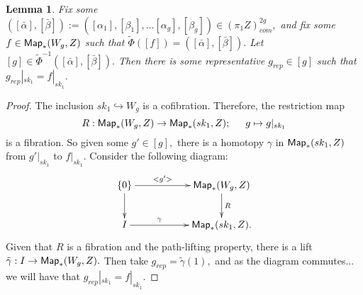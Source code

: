 \documentclass{amsart}
\newtheorem{lemma}[theorem]{Lemma}
\theoremstyle{definition}
\theoremstyle{remark}
\begin{document}
\begin{lemma} \label{rep}
Fix some $([\bar{\alpha}] ,[\bar{\beta}]) := ([\alpha_{1}], [\beta_{1}], \hdots [\alpha_{g}], [\beta_{g}]) \in (\pi_{1}Z)^{2g}_{com},$ and fix some $f \in {\sf Map}_{\ast}(W_{g}, Z)$ such that $\tilde{\Phi}([f]) = ([\bar{\alpha}] ,[\bar{\beta}]).$
Let $[g] \in \tilde{\Phi}^{-1}([\bar{\alpha}] ,[\bar{\beta}]).$ Then there is some representative $g_{rep} \in [g]$ such that $g_{rep}|_{sk_{1}} = f|_{sk_{1}}.$
\end{lemma}
\begin{proof}
The inclusion $sk_{1} \hookrightarrow W_{g}$ is a cofibration. Therefore, the restriction map $$R: {\sf Map}_{\ast}(W_{g}, Z) \rightarrow {\sf Map}_{\ast}(sk_{1}, Z); \hspace{15pt} g \mapsto g|_{sk_{1}}$$ is a fibration. So given some $g' \in [g],$ there is a homotopy $\gamma$ in  ${\sf Map}_{\ast}(sk_{1}, Z)$ from $g'|_{sk_{1}}$ to $f|_{sk_{1}}.$ Consider the following diagram:
$$
\xymatrix{
\{0\} \ar[rr]^-{<g'>} \ar[d]^-{}
&&
{\sf Map}_{\ast}(W_{g}, Z) \ar[d]^-{R}
\\
I \ar[rr]^-{\gamma} 
&&
{\sf Map}_{\ast}(sk_{1}, Z).
}$$
Given that $R$ is a fibration and the path-lifting property, there is a lift $\tilde{\gamma}: I \rightarrow {\sf Map}_{\ast}(W_{g}, Z).$ Then take $g_{rep} = \tilde{\gamma}(1),$ and as the diagram commutes... we will have that $g_{rep}|_{sk_{1}} = f|_{sk_{1}}.$
\end{proof}
\end{document}
